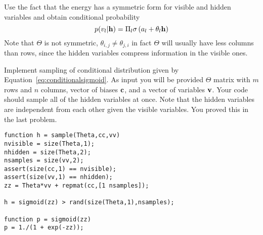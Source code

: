\documentclass{article}
\begin{document}
Use the fact that the energy has a symmetric form for visible and hidden variables and obtain conditional probability
\[
p(v_l | \mathbf{h}) = \Pi_l \sigma\left(a_l + \theta_l \mathbf{h}\right)
\]
Note that $\Theta$ is not symmetric, $\theta_{i,j} \neq \theta_{j,i}$ in fact $\Theta$ will usually have less columns than rows, since the hidden variables compress information in the visible ones.

\newproblem{2pt}

Implement sampling of conditional distribution given by Equation~\ref{eq:conditionalsigmoid}.
As input you will be provided $\Theta$ matrix with $m$ rows and $n$ columns, vector of biases $\mathbf{c}$, and a vector of variables $\mathbf{v}$.
Your code should sample all of the hidden variables at once. Note that the hidden variables are independent from each other given the visible variables. You proved this in the last problem.
\begin{verbatim}
function h = sample(Theta,cc,vv)
nvisible = size(Theta,1);
nhidden = size(Theta,2);
nsamples = size(vv,2);
assert(size(cc,1) == nvisible);
assert(size(vv,1) == nhidden);
zz = Theta*vv + repmat(cc,[1 nsamples]);

h = sigmoid(zz) > rand(size(Theta,1),nsamples);

function p = sigmoid(zz)
p = 1./(1 + exp(-zz));
\end{verbatim}



\begin{center}


\end{center}
\end{document}
